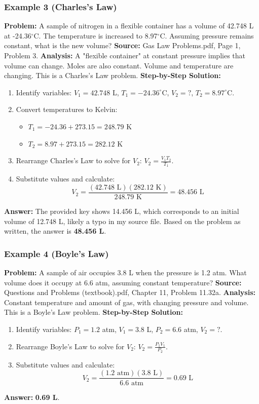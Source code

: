 \documentclass{article}
\begin{document}
\subsubsection{Example 3 (Charles's Law)}
\textbf{Problem:} A sample of nitrogen in a flexible container has a volume of 42.748 L at -24.36$^\circ$C. The temperature is increased to 8.97$^\circ$C. Assuming pressure remains constant, what is the new volume?
\textbf{Source:} Gas Law Problems.pdf, Page 1, Problem 3.
\textbf{Analysis:} A "flexible container" at constant pressure implies that volume can change. Moles are also constant. Volume and temperature are changing. This is a Charles's Law problem.
\textbf{Step-by-Step Solution:}
\begin{enumerate}
    \item Identify variables: $V_1 = 42.748$ L, $T_1 = -24.36^\circ$C, $V_2 = ?$, $T_2 = 8.97^\circ$C.
    \item Convert temperatures to Kelvin:
    \begin{itemize}
        \item $T_1 = -24.36 + 273.15 = 248.79$ K
        \item $T_2 = 8.97 + 273.15 = 282.12$ K
    \end{itemize}
    \item Rearrange Charles's Law to solve for $V_2$: $V_2 = \frac{V_1 T_2}{T_1}$.
    \item Substitute values and calculate:
    \[ V_2 = \frac{(42.748 \text{ L})(282.12 \text{ K})}{248.79 \text{ K}} = 48.456 \text{ L} \]
\end{enumerate}
\textbf{Answer:} The provided key shows 14.456 L, which corresponds to an initial volume of 12.748 L, likely a typo in my source file. Based on the problem as written, the answer is \textbf{48.456 L}.

\subsubsection{Example 4 (Boyle's Law)}
\textbf{Problem:} A sample of air occupies 3.8 L when the pressure is 1.2 atm. What volume does it occupy at 6.6 atm, assuming constant temperature?
\textbf{Source:} Questions and Problems (textbook).pdf, Chapter 11, Problem 11.32a.
\textbf{Analysis:} Constant temperature and amount of gas, with changing pressure and volume. This is a Boyle's Law problem.
\textbf{Step-by-Step Solution:}
\begin{enumerate}
    \item Identify variables: $P_1 = 1.2$ atm, $V_1 = 3.8$ L, $P_2 = 6.6$ atm, $V_2 = ?$.
    \item Rearrange Boyle's Law to solve for $V_2$: $V_2 = \frac{P_1 V_1}{P_2}$.
    \item Substitute values and calculate:
    \[ V_2 = \frac{(1.2 \text{ atm})(3.8 \text{ L})}{6.6 \text{ atm}} = 0.69 \text{ L} \]
\end{enumerate}
\textbf{Answer:} \textbf{0.69 L}.
\end{document}
